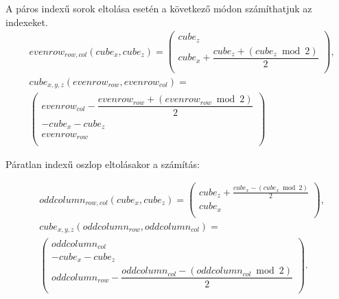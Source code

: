 %

A páros indexű sorok eltolása esetén a következő módon számíthatjuk az indexeket.
\begin{align*}
&evenrow_{row, col}(cube_{x}, cube_{z}) =
\left(
\begin{array}{c}
cube_{z} \\
cube_{x} + \dfrac{cube_{z} + (cube_{z} \bmod 2)}{2} \\
\end{array}
\right),
\\
&cube_{x, y, z}(evenrow_{row}, evenrow_{col}) = \\
&\left(
\begin{array}{c}
evenrow_{col} - \dfrac{evenrow_{row} + (evenrow_{row} \bmod 2)}{2} \\
-cube_{x} - cube_{z} \\
evenrow_{row} \\
\end{array}
\right)
\end{align*}


%

Páratlan indexű oszlop eltolásakor a számítás:

\begin{align*}
&oddcolumn_{row, col}(cube_{x}, cube_{z}) =
\left(
\begin{array}{c}
cube_{z} + \frac{cube_{x} - (cube_{x} \bmod 2)}{2} \\
cube_{x} \\
\end{array}
\right),
\\
&cube_{x,y,z} (oddcolumn_{row}, oddcolumn_{col}) = \\
&\left(
\begin{array}{c}
oddcolumn_{col} \\
-cube_{x} - cube_{z} \\
oddcolumn_{row} - \dfrac{oddcolumn_{col} - (oddcolumn_{col} \bmod 2)}{2} \\
\end{array}
\right).
\end{align*}

